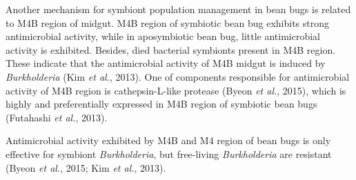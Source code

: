 \documentclass[11pt]{article}
\begin{document}
\newline

Another mechanism for symbiont population management in bean bugs is related to M4B region of midgut. 
M4B region of symbiotic bean bug exhibits strong antimicrobial activity, while in aposymbiotic bean bug, little antimicrobial activity is exhibited. 
Besides, died bacterial symbionts present in M4B region. 
These indicate that the antimicrobial activity of M4B midgut is induced by \textit{Burkholderia} (Kim \textit{et al.}, 2013). 
One of components responsible for antimicrobial activity of M4B region is cathepsin-L-like protease (Byeon \textit{et al.}, 2015), which is highly and preferentially expressed in M4B region of symbiotic bean bugs (Futahashi \textit{et al.}, 2013). 

\newline

Antimicrobial activity exhibited by M4B and M4 region of bean bugs is only effective for symbiont \textit{Burkholderia}, but free-living \textit{Burkholderia} are resistant (Byeon \textit{et al.}, 2015; Kim \textit{et al.}, 2013). 
\end{document}
